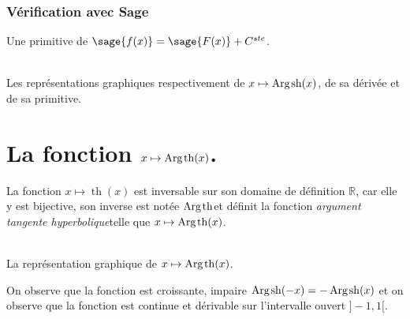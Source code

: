 \documentclass[a4paper,12pt]{report}
\def\eclaire{\mathbb}
\def\R{\ensuremath{\eclaire R}}
\renewcommand{\sinh}{\mathop{\mathrm{sh}}}
\renewcommand{\tanh}{\mathop{\mathrm{th}}}
\renewcommand{\arg}{\mathop{\mathrm{Arg}}}
\begin{document}
\subsubsection{Vérification avec Sage}

Une primitive de $\sage{f(x)} = \sage{F(x)} + C^{ste} $.

\begin{center}
\\
Les représentations graphiques respectivement de $x \mapsto \arg\mspace{-1mu}\sinh(x)$, de sa dérivée et de sa primitive.
\end{center}




























\section{La fonction  $x \mapsto \arg\mspace{-1mu}\tanh(x)$.}

La fonction $x \mapsto \tanh(x)$ est inversable sur son domaine de définition $\R$, car elle y est bijective, son inverse est notée \og$ \arg\mspace{-1mu}\tanh $\fg et définit la fonction \og\emph{argument tangente hyperbolique}\fg telle que $x \mapsto \arg\mspace{-1mu}\tanh(x)$.


\begin{center}
 \\
La représentation graphique de $x \mapsto \arg\mspace{-1mu}\tanh(x)$.
\end{center}
On observe que la fonction est croissante, impaire $\arg\mspace{-1mu}\sinh(-x) = -\arg\mspace{-1mu}\sinh(x) $
et on observe que la fonction est continue et dérivable sur l'intervalle ouvert $]-1,1[$.                                                                                                             
\end{document}
